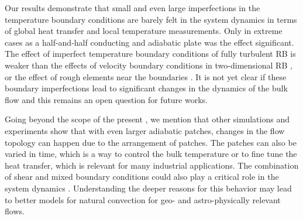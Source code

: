 Our results demonstrate that small and even large imperfections in the
temperature boundary conditions are barely felt in the system dynamics in
terms of global heat transfer and local temperature measurements.  Only in
extreme cases as a half-and-half conducting and adiabatic plate was the effect
significant. The effect of imperfect temperature boundary conditions of fully
turbulent RB is weaker than the effects of velocity boundary conditions in
two-dimensional RB \citep{vanderPoel2014}, or the effect of rough elements near the
boundaries \citep{Tisserand2011}. It is not yet clear if these boundary imperfections
lead to significant changes in the dynamics of the bulk flow and this remains
an open question for future works.

Going beyond the scope of the present \docname, we mention that other simulations
and experiments \citep{Cooper2013,Wang2017} show that with even
larger adiabatic patches, changes in the flow topology can happen due to the
arrangement of patches.
The patches can also be varied in time, which is a way to control the bulk
temperature or to fine tune the heat transfer, which is relevant for many
industrial applications.
The combination of shear and
mixed boundary conditions could also play a critical role in the system
dynamics \citep{Whitehead2015}.
Understanding the deeper reasons for this behavior may lead to better models
for natural convection for geo- and astro-physically relevant flows.

\graphicspath{{fig/}}

